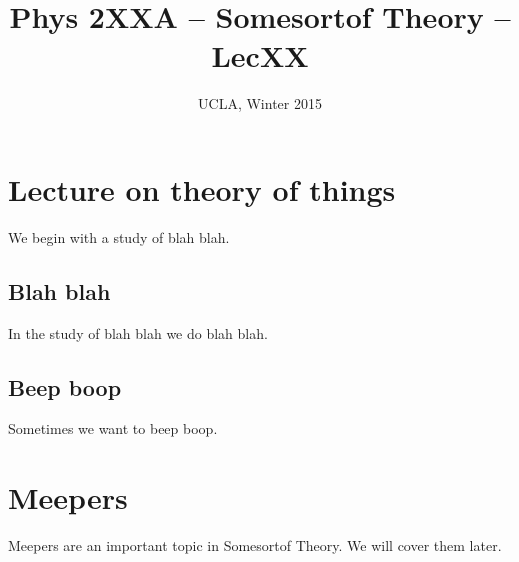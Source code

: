 \documentclass[12pt]{article} %
\title{Phys 2XXA -- Somesortof Theory -- LecXX}
\author{UCLA, Winter 2015}
\date{\formatdate{14}{01}{2015}} %
\begin{document}
\maketitle


\section{Lecture on theory of things}

We begin with a study of blah blah. 


\subsection{Blah blah}

In the study of blah blah we do blah blah. 


\subsection{Beep boop}

Sometimes we want to beep boop. 


\section{Meepers}

Meepers are an important topic in Somesortof Theory. We will cover them later. 
\end{document}
